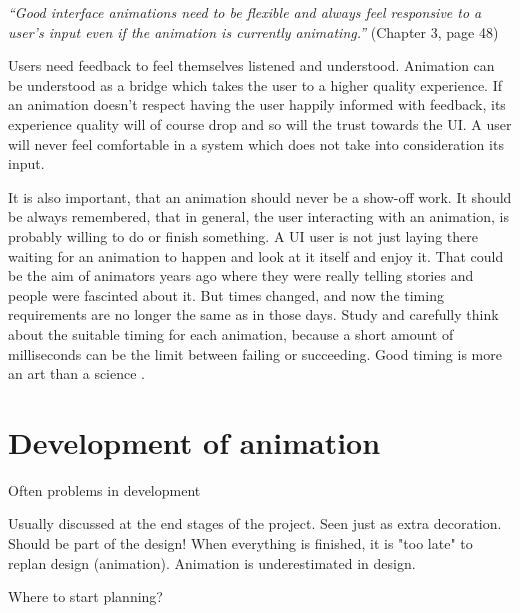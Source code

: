 \vspace{5mm}

{\em“Good interface animations need to be flexible and always feel responsive to a user’s input even if the animation is currently animating.”}\citet{head2016designing} (Chapter 3, page 48)

\vspace{5mm}

Users need feedback to feel themselves listened and understood. Animation can be understood as a bridge which takes the user to a higher quality experience. If an animation doesn’t respect having the user happily informed with feedback, its experience quality will of course drop and so will the trust towards the UI. A user will never feel comfortable in a system which does not take into consideration its input. 

It is also important, that an animation should never be a show-off work. It should be always remembered, that in general, the user interacting with an animation, is probably willing to do or finish something. A UI user is not just laying there waiting for an animation to happen and look at it itself and enjoy it. That could be the aim of animators years ago where they were really telling stories and people were fascinted about it. But times changed, and now the timing requirements are no longer the same as in those days. Study and carefully think about the suitable timing for each animation, because a short amount of milliseconds can be the limit between failing or succeeding. Good timing is more an art than a science \citep{head2016designing}.

\section{Development of animation} %
\label{sec:anime_dev}


Often problems in development

Usually discussed at the end stages of the project.
Seen just as extra decoration.
Should be part of the design!
When everything is finished, it is "too late" to replan design (animation).
Animation is underestimated in design.

Where to start planning?

